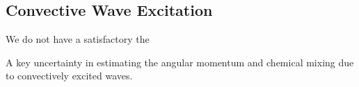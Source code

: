 {\color{purple}
\subsection{Convective Wave Excitation}
}

We do not have a satisfactory the

A key uncertainty in estimating the angular momentum and chemical mixing due to convectively excited waves.
